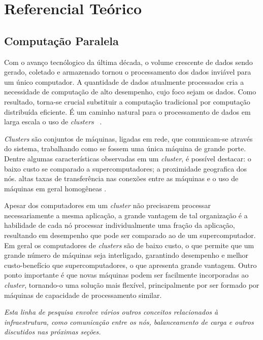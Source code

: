 \chapter{Referencial Teórico}
\label{cap:referencial}

 
\section{ Computação Paralela}


Com o avanço tecnólogico da última década, o volume crescente de dados sendo gerado, coletado e armazenado tornou o processamento dos dados inviável para um único computador. A quantidade de dados atualmente processados cria a necessidade de computação de alto desempenho, cujo foco sejam os dados.  Como resultado, torna-se crucial substituir a computação tradicional por computação distribuída eficiente. 
É um caminho natural para o processamento de dados em larga escala o uso de \textit{clusters} ~\cite{Lin:2010}.

\textit{Clusters} são conjuntos de máquinas, ligadas em rede, que comunicam-se através do sistema, trabalhando como se fossem uma única máquina de grande porte. 
Dentre algumas características observadas em um \textit{cluster}, é possível destacar: o baixo custo se comparado a supercomputadores; a proximidade geografica dos nós. altas taxas de transferência nas conexões entre as máquinas e o uso de máquinas em geral homogêneas \cite{Toth:2008}.

Apesar dos computadores em um \textit{cluster} não precisarem processar necessariamente a mesma aplicação, a grande vantagem de tal organização é a habilidade de cada nó processar individualmente uma fração da aplicação, resultando em desempenho que pode ser comparado ao de um supercomputador.
Em geral os computadores de \textit{clusters} são de baixo custo, o que permite que um grande número de máquinas seja interligado, garantindo desempenho e melhor custo-benefício que supercomputadores, o que apresenta grande vantagem. Outro ponto importante é que novas máquinas podem ser facilmente incorporadas  ao \textit{cluster}, tornando-o uma solução mais flexível, principalmente por ser formado por máquinas de capacidade de processamento similar.

\textit{Esta linha de pesquisa envolve vários outros conceitos relacionados à infraestrutura, como comunicação entre os nós, balanceamento de carga e outros discutidos nas próximas seções.}



